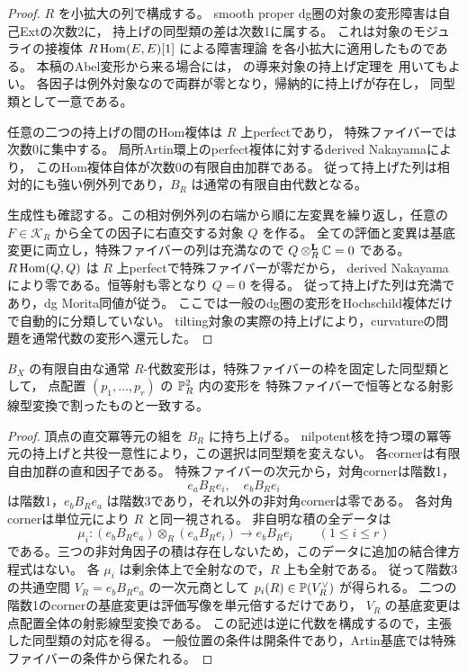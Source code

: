 \begin{proof}
$R$ を小拡大の列で構成する。
smooth proper dg圏の対象の変形障害は自己Extの次数2に，
持上げの同型類の差は次数1に属する。
これは対象のモジュライの接複体
$R\operatorname{Hom}(E,E)[1]$ による障害理論
\cite[Corollaries~3.15, 3.17]{ToenVaquie2007}を各小拡大に適用したものである。
本稿のAbel変形から来る場合には，
\cite[Theorem~B, Theorem~6.10]{LowenObstruction2005}の導来対象の持上げ定理を
用いてもよい。
各因子は例外対象なので両群が零となり，帰納的に持上げが存在し，
同型類として一意である。

任意の二つの持上げの間のHom複体は $R$ 上perfectであり，
特殊ファイバーでは次数0に集中する。
局所Artin環上のperfect複体に対するderived Nakayamaにより，
このHom複体自体が次数0の有限自由加群である。
従って持上げた列は相対的にも強い例外列であり，$B_R$ は通常の有限自由代数となる。

生成性も確認する。この相対例外列の右端から順に左変異を繰り返し，任意の
$F\in\mathcal K_R$ から全ての因子に右直交する対象 $Q$ を作る。
全ての評価と変異は基底変更に両立し，特殊ファイバーの列は充満なので
$Q\otimes_R^{\mathbf L}\mathbb C=0$ である。
$R\operatorname{Hom}(Q,Q)$ は $R$ 上perfectで特殊ファイバーが零だから，
derived Nakayamaにより零である。恒等射も零となり $Q=0$ を得る。
従って持上げた列は充満であり，dg Morita同値が従う。
ここでは一般のdg圏の変形をHochschild複体だけで自動的に分類していない。
tilting対象の実際の持上げにより，curvatureの問題を通常代数の変形へ還元した。
\end{proof}

\begin{lemma}[点配置代数のArtin変形]
\label{lem:surface-ku-algebra-points}
$B_X$ の有限自由な通常 $R$-代数変形は，特殊ファイバーの枠を固定した同型類として，
点配置 $(p_1,\ldots,p_r)$ の $\mathbb P^2_R$ 内の変形を
特殊ファイバーで恒等となる射影線型変換で割ったものと一致する。
\end{lemma}

\begin{proof}
頂点の直交冪等元の組を $B_R$ に持ち上げる。
nilpotent核を持つ環の冪等元の持上げと共役一意性により，この選択は同型類を変えない。
各cornerは有限自由加群の直和因子である。
特殊ファイバーの次元から，対角cornerは階数1，
\[
 e_aB_Re_i,\quad e_bB_Re_i
\]
は階数1，$e_bB_Re_a$ は階数3であり，それ以外の非対角cornerは零である。
各対角cornerは単位元により $R$ と同一視される。
非自明な積の全データは
\[
 \mu_i:(e_bB_Re_a)\otimes_R(e_aB_Re_i)\longrightarrow e_bB_Re_i
 \qquad(1\le i\le r)
\]
である。三つの非対角因子の積は存在しないため，このデータに追加の結合律方程式はない。
各 $\mu_i$ は剰余体上で全射なので，$R$ 上も全射である。
従って階数3の共通空間 $V_R=e_bB_Re_a$ の一次元商として
$p_i(R)\in\mathbb P(V_R^\vee)$ が得られる。
二つの階数1のcornerの基底変更は評価写像を単元倍するだけであり，
$V_R$ の基底変更は点配置全体の射影線型変換である。
この記述は逆に代数を構成するので，主張した同型類の対応を得る。
一般位置の条件は開条件であり，Artin基底では特殊ファイバーの条件から保たれる。
\end{proof}

